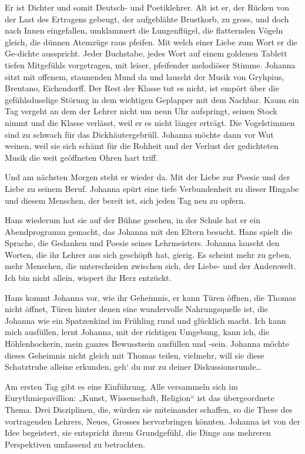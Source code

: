 \documentclass[10pt,a5paper]{book}
\begin{document}
Er ist Dichter und somit Deutsch- und Poetiklehrer. Alt ist er, der Rücken von der Last des Ertragens gebeugt, der aufgeblähte Brustkorb, zu gross, und doch nach Innen eingefallen, umklammert die Lungenflügel, die flatternden Vögeln gleich, die dünnen Atemzüge raus pfeifen. Mit welch einer Liebe zum Wort er die Ge-dichte ausspricht. Jeder Buchstabe, jedes Wort auf einem goldenen Tablett tiefen Mitgefühls vorgetragen, mit leiser, pfeifender melodiöser Stimme. Johanna sitzt mit offenem, staunenden Mund da und lauscht der Musik von Gryhpius, Brentano, Eichendorff. Der Rest der Klasse tut es nicht, ist empört über die gefühlsduselige Störung in dem wichtigen Geplapper mit dem Nachbar. Kaum ein Tag  vergeht an dem der Lehrer nicht um neun Uhr aufspringt, seinen Stock nimmt und die Klasse verlässt, weil er es nicht länger erträgt. Die Vogelstimmen sind zu schwach für das Dickhäutergebrüll. Johanna möchte dann vor Wut weinen, weil sie sich schämt für die Rohheit und der Verlust der gedichteten Musik die weit geöffneten Ohren hart triff.

Und am nächsten Morgen steht er wieder da. Mit der Liebe zur Poesie und der Liebe zu seinem Beruf. Johanna spürt eine tiefe Verbundenheit zu dieser Hingabe und diesem Menschen, der bereit ist, sich jeden Tag neu zu opfern.

Hans wiederum hat sie auf der Bühne gesehen, in der Schule hat er ein Abendprogramm gemacht, das Johanna mit den Eltern besucht. Hans spielt die Sprache, die Gedanken und Poesie seines Lehrmeisters. Johanna lauscht den Worten, die ihr Lehrer aus sich geschöpft hat, gierig. Es scheint mehr zu geben, mehr Menschen, die unterscheiden zwischen sich, der Liebe- und der Anderswelt. Ich bin nicht allein, wispert ihr Herz entzückt.

Hans kommt Johanna vor, wie ihr Geheimnis, er kann Türen öffnen, die Thomas nicht öffnet, Türen hinter denen eine wundervolle Nahrungsquelle ist, die Johanna wie ein Spatzenkind im Frühling rund und glücklich macht. Ich kann mich ausfüllen, lernt Johanna, mit der richtigen Umgebung, kann ich, die Höhlenhockerin, mein ganzes Bewusstsein ausfüllen und -sein. Johanna möchte dieses Geheimnis nicht gleich mit Thomas teilen, vielmehr, will sie diese Schatztruhe alleine erkunden, geh` du nur zu deiner Diskussionsrunde\dots 

Am ersten Tag gibt es eine Einführung. Alle versammeln sich im Eurythmiepavillion: „Kunst, Wissenschaft, Religion“ ist das übergeordnete Thema. Drei Disziplinen, die, würden sie miteinander schaffen, so die These des vortragenden Lehrers, Neues, Grosses hervorbringen könnten. Johanna ist von der Idee begeistert, sie entspricht ihrem Grundgefühl,  die Dinge aus mehreren Perspektiven umfassend zu betrachten.
\end{document}
